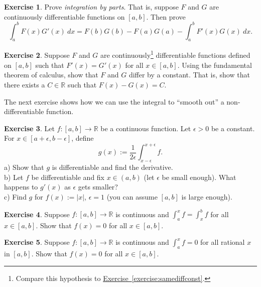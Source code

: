 \documentclass[12pt]{book}
\newcommand{\abs}[1]{\left\lvert {#1} \right\rvert}
\newcommand{\R}{{\mathbb{R}}}
\newcommand{\myindex}[1]{#1\index{#1}}
\theoremstyle{plain}
\theoremstyle{remark}
\theoremstyle{definition}
\newenvironment{exnote}{\small}{}
\theoremstyle{exercise}
\newtheorem{exercise}{Exercise}[section]
\theoremstyle{example}
\newcommand{\exerciseref}[1]{\hyperref[#1]{Exercise~\ref*{#1}}}
\begin{document}
\begin{exercise}
Prove \emph{\myindex{integration by parts}}.  That is, suppose $F$ and
$G$ are continuously differentiable functions on $[a,b]$.  Then prove
\begin{equation*}
\int_a^b F(x)G'(x)~dx
=
F(b)G(b)-F(a)G(a)
-
\int_a^b F'(x)G(x)~dx .
\end{equation*}
\end{exercise}

\begin{exercise}
Suppose $F$ and $G$ are
continuously\footnote{
Compare this hypothesis to \exerciseref{exercise:samediffconst}.}
differentiable
functions defined on $[a,b]$
such that $F'(x) = G'(x)$ for all $x \in [a,b]$.
Using the fundamental theorem of calculus,
show that $F$ and $G$ differ by a constant.  That is, show that
there exists a $C \in \R$ such that
$F(x)-G(x) = C$.
\end{exercise}

\begin{exnote}
The next exercise shows how we can use the integral to ``smooth out'' a
non-differentiable function.
\end{exnote}

\begin{exercise} \label{exercise:smoothingout}
Let $f \colon [a,b] \to \R$ be a continuous function.  Let $\epsilon > 0$
be a constant.  For $x \in [a+\epsilon,b-\epsilon]$, define
\begin{equation*}
g(x) := \frac{1}{2\epsilon} \int_{x-\epsilon}^{x+\epsilon} f .
\end{equation*}
a) Show that $g$ is differentiable and find the derivative.
\\
b) Let $f$ be differentiable and fix $x \in (a,b)$ (let $\epsilon$
be small enough).  What happens to $g'(x)$ as $\epsilon$ gets smaller?
\\
c) Find $g$ for $f(x) := \abs{x}$, $\epsilon = 1$ (you can assume 
$[a,b]$ is large enough).
\end{exercise}

\begin{exercise}
Suppose $f \colon [a,b] \to \R$ is continuous and
$\int_a^x f = \int_x^b f$ for all $x \in [a,b]$.  Show that $f(x) = 0$
for all $x \in [a,b]$.
\end{exercise}

\begin{exercise}
Suppose $f \colon [a,b] \to \R$ is continuous and
$\int_a^x f = 0$ for all rational $x$ in $[a,b]$.  Show that $f(x) = 0$
for all $x \in [a,b]$.
\end{exercise}
\end{document}

